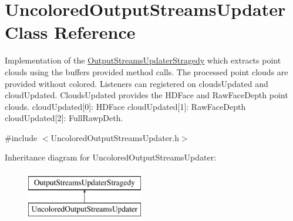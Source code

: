 \hypertarget{class_uncolored_output_streams_updater}{}\section{Uncolored\+Output\+Streams\+Updater Class Reference}
\label{class_uncolored_output_streams_updater}


Implementation of the \hyperlink{class_output_streams_updater_stragedy}{Output\+Streams\+Updater\+Stragedy} which extracts point clouds using the buffers provided method calls. The processed point clouds are provided without colored. Listeners can registered on clouds\+Updated and cloud\+Updated. Clouds\+Updated provides the H\+D\+Face and Raw\+Face\+Depth point clouds. cloud\+Updated\mbox{[}0\mbox{]}\+: H\+D\+Face cloud\+Updated\mbox{[}1\mbox{]}\+: Raw\+Face\+Depth cloud\+Updated\mbox{[}2\mbox{]}\+: Full\+Rawp\+Deth.  




{\ttfamily \#include $<$Uncolored\+Output\+Streams\+Updater.\+h$>$}

Inheritance diagram for Uncolored\+Output\+Streams\+Updater\+:\begin{figure}[H]
\begin{center}
\leavevmode
\includegraphics[height=2.000000cm]{class_uncolored_output_streams_updater}
\end{center}
\end{figure}
